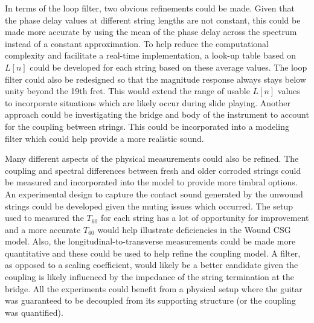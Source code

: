 \documentclass[../main.tex]{subfiles}
\begin{document}
In terms of the loop filter, two obvious refinements could be made. Given that the phase delay values at different string lengths are not constant, this could be made more accurate by using the mean of the phase delay across the spectrum instead of a constant approximation. To help reduce the computational complexity and facilitate a real-time implementation, a look-up table based on $L[n]$ could be developed for each string based on these average values. The loop filter could also be redesigned so that the magnitude response always stays below unity beyond the 19th fret. This would extend the range of usable $L[n]$ values to incorporate situations which are likely occur during slide playing. Another approach could be investigating the bridge and body of the instrument to account for the coupling between strings. This could be incorporated into a modeling filter which could help provide a more realistic sound.

Many different aspects of the physical measurements could also be refined. The coupling and spectral differences between fresh and older corroded strings could be measured and incorporated into the model to provide more timbral options. An experimental design to capture the contact sound generated by the unwound strings could be developed given the muting issues which occurred. The setup used to measured the $T_{60}$ for each string has a lot of opportunity for improvement and a more accurate $T_{60}$ would help illustrate deficiencies in the Wound CSG model. Also, the longitudinal-to-transverse measurements could be made more quantitative and these could be used to help refine the coupling model. A filter, as opposed to a scaling coefficient, would likely be a better candidate given the coupling is likely influenced by the impedance of the string termination at the bridge. All the experiments could benefit from a physical setup where the guitar was guaranteed to be decoupled from its supporting structure (or the coupling was quantified).
\end{document}

